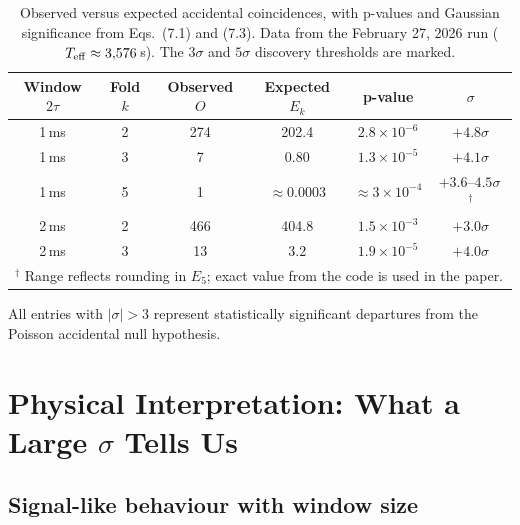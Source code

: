 \documentclass[12pt]{article}
\theoremstyle{definition}
\theoremstyle{remark}
\newcommand{\obs}{O}
\newcommand{\Eacc}{E}
\newcommand{\nsig}{\sigma}
\begin{document}
\begin{table}[ht]
  \centering
  \caption{Observed versus expected accidental coincidences, with
    p-values and Gaussian significance from Eqs.~(7.1) and (7.3).
    Data from the February 27, 2026 run ($T_{\rm eff} \approx
    3{,}576$\,s).  The $3\sigma$ and $5\sigma$ discovery thresholds
    are marked.}
  \label{tab:results}
  \renewcommand{\arraystretch}{1.35}
  \begin{tabular}{cccccc}
    \toprule
    Window $2\tau$ & Fold $k$ & Observed $\obs$ &
      Expected $\Eacc_k$ & p-value & $\nsig$ \\
    \midrule
    1\,ms  & 2 & 274 & 202.4 & $2.8\times10^{-6}$  & $+4.8\sigma$ \\
    1\,ms  & 3 & 7   & 0.80  & $1.3\times10^{-5}$  & $+4.1\sigma$ \\
    1\,ms  & 5 & 1   & $\approx 0.0003$ & $\approx 3\times10^{-4}$ & $+3.6\text{--}4.5\sigma$\,$^\dagger$ \\
    2\,ms  & 2 & 466 & 404.8 & $1.5\times10^{-3}$  & $+3.0\sigma$ \\
    2\,ms  & 3 & 13  & 3.2   & $1.9\times10^{-5}$  & $+4.0\sigma$ \\
    \bottomrule
    \multicolumn{6}{l}{$^\dagger$ Range reflects rounding in
      $\Eacc_5$; exact value from the code is used in the paper.}
  \end{tabular}
\end{table}

All entries with $|\nsig| > 3$ represent statistically significant
departures from the Poisson accidental null hypothesis.

\section{Physical Interpretation: What a Large $\sigma$ Tells Us}
\label{sec:physical}

\subsection{Signal-like behaviour with window size}
\end{document}
